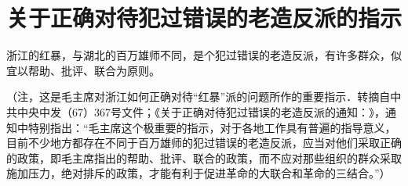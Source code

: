 \section[关于正确对待犯过错误的老造反派的指示（一九六七年十一月）]{关于正确对待犯过错误的老造反派的指示}


浙江的红暴，与湖北的百万雄师不同，是个犯过错误的老造反派，有许多群众，似宜以帮助、批评、联合为原则。

（注，这是毛主席对浙江如何正确对待“红暴”派的问题所作的重要指示．转摘自中共中央中发（67）367号文件；《关于正确对待犯过错误的老造反派的通知：》，通知中特别指出：“毛主席这个极重要的指示，对于各地工作具有普遍的指导意义，目前不少地方都存在不同于百万雄师的犯过错误的老造反派，应当对他们采取正确的政策，即毛主席指出的帮助、批评、联合的政策，而不应对那些组织的群众采取施加压力，绝对排斥的政策，才能有利于促进革命的大联合和革命的三结合。”）


